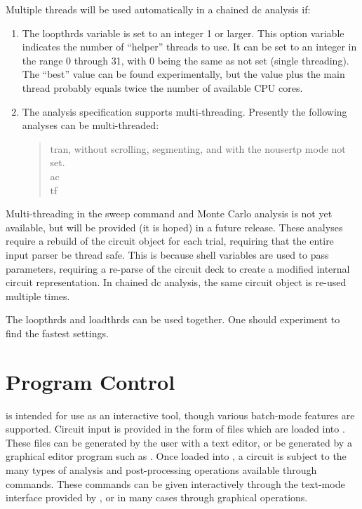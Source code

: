 Multiple threads will be used automatically in a chained dc analysis
if:

\begin{enumerate}
\item{The {\et loopthrds} variable is set to an integer 1 or larger. 
This option variable indicates the number of ``helper'' threads to
use.  It can be set to an integer in the range 0 through 31, with 0
being the same as not set (single threading).  The ``best'' value can
be found experimentally, but the value plus the main thread probably
equals twice the number of available CPU cores.}

\item{The analysis specification supports multi-threading.  Presently
the following analyses can be multi-threaded:
\begin{quote}
{\cb tran}, without scrolling, segmenting, and with the {\et nousertp}
mode not set.\\
{\cb ac}\\
{\cb tf}
\end{quote}}
\end{enumerate}

Multi-threading in the {\cb sweep} command and Monte Carlo analysis is
not yet available, but will be provided (it is hoped) in a future
release.  These analyses require a rebuild of the circuit object for
each trial, requiring that the entire input parser be thread safe. 
This is because shell variables are used to pass parameters, requiring
a re-parse of the circuit deck to create a modified internal circuit
representation.  In chained dc analysis, the same circuit object is
re-used multiple times. 

The {\et loopthrds} and {\et loadthrds} can be used together.  One
should experiment to find the fastest settings.


\section{Program Control}


{\WRspice} is intended for use as an interactive tool, though various
batch-mode features are supported.  Circuit input is provided in the form
of files which are loaded into {\WRspice}.  These files can be generated
by the user with a text editor, or be generated by a graphical editor
program such as {\Xic}.  Once loaded into {\WRspice}, a circuit is subject
to the many types of analysis and post-processing operations available
through {\WRspice} commands.  These commands can be given interactively
through the text-mode interface provided by {\WRspice}, or in many cases
through graphical operations.

